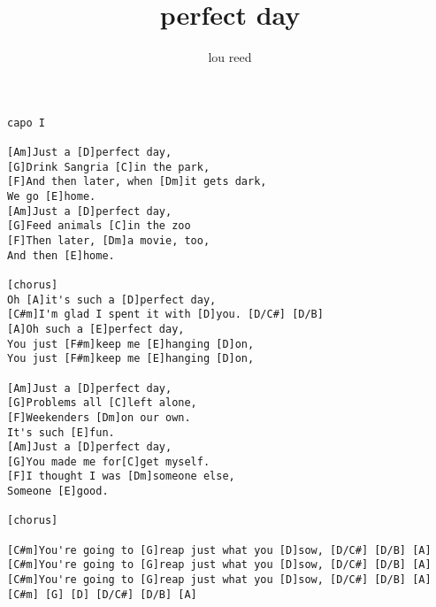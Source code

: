 \author{lou reed}
\title{perfect day}
\maketitle
\begin{verbatim}
capo I

[Am]Just a [D]perfect day,
[G]Drink Sangria [C]in the park,
[F]And then later, when [Dm]it gets dark, 
We go [E]home.
[Am]Just a [D]perfect day,
[G]Feed animals [C]in the zoo
[F]Then later, [Dm]a movie, too,
And then [E]home.

[chorus]
Oh [A]it's such a [D]perfect day, 
[C#m]I'm glad I spent it with [D]you. [D/C#] [D/B]
[A]Oh such a [E]perfect day,
You just [F#m]keep me [E]hanging [D]on,
You just [F#m]keep me [E]hanging [D]on,

[Am]Just a [D]perfect day,
[G]Problems all [C]left alone,
[F]Weekenders [Dm]on our own.
It's such [E]fun.
[Am]Just a [D]perfect day,
[G]You made me for[C]get myself.
[F]I thought I was [Dm]someone else,
Someone [E]good.

[chorus]

[C#m]You're going to [G]reap just what you [D]sow, [D/C#] [D/B] [A]
[C#m]You're going to [G]reap just what you [D]sow, [D/C#] [D/B] [A]
[C#m]You're going to [G]reap just what you [D]sow, [D/C#] [D/B] [A]
[C#m] [G] [D] [D/C#] [D/B] [A]
\end{verbatim}